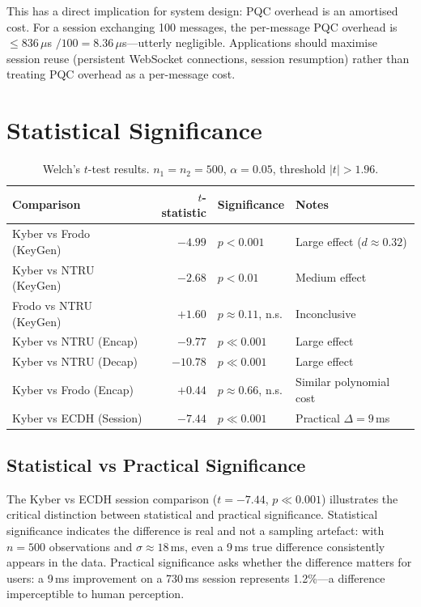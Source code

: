 \documentclass[12pt,a4paper]{report}
\begin{document}
This has a direct implication for system design: PQC overhead is an amortised cost.
For a session exchanging 100 messages, the per-message PQC overhead is
$\leq 836\,\mu$s $/ 100 = 8.36\,\mu$s---utterly negligible. Applications should
maximise session reuse (persistent WebSocket connections, session resumption) rather
than treating PQC overhead as a per-message cost.

\section{Statistical Significance}

\begin{table}[H]
\centering
\caption{Welch's $t$-test results. $n_1 = n_2 = 500$, $\alpha = 0.05$, threshold
$|t| > 1.96$.}
\label{tab:ttests}
\begin{tabular}{l|r|l|l}
\toprule
\textbf{Comparison} & \textbf{$t$-statistic} & \textbf{Significance} & \textbf{Notes} \\
\midrule
Kyber vs Frodo (KeyGen) & $-4.99$ & $p < 0.001$ & Large effect ($d \approx 0.32$) \\
Kyber vs NTRU (KeyGen) & $-2.68$ & $p < 0.01$ & Medium effect \\
Frodo vs NTRU (KeyGen) & $+1.60$ & $p \approx 0.11$, n.s. & Inconclusive \\
Kyber vs NTRU (Encap) & $-9.77$ & $p \ll 0.001$ & Large effect \\
Kyber vs NTRU (Decap) & $-10.78$ & $p \ll 0.001$ & Large effect \\
Kyber vs Frodo (Encap) & $+0.44$ & $p \approx 0.66$, n.s. & Similar polynomial cost \\
\midrule
Kyber vs ECDH (Session) & $-7.44$ & $p \ll 0.001$ & Practical $\Delta = 9$\,ms \\
\bottomrule
\end{tabular}
\end{table}

\subsection{Statistical vs Practical Significance}

The Kyber vs ECDH session comparison ($t = -7.44$, $p \ll 0.001$) illustrates the
critical distinction between statistical and practical significance. Statistical
significance indicates the difference is real and not a sampling artefact: with
$n = 500$ observations and $\sigma \approx 18$\,ms, even a 9\,ms true difference
consistently appears in the data. Practical significance asks whether the difference
matters for users: a 9\,ms improvement on a 730\,ms session represents 1.2\%---a
difference imperceptible to human perception.
\end{document}
